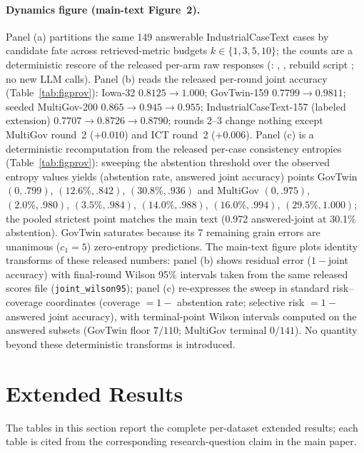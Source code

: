\documentclass[letterpaper]{article}
\begin{document}
\paragraph{Dynamics figure (main-text Figure~2).}
Panel (a) partitions the same 149 answerable IndustrialCaseText cases by candidate fate across retrieved-metric budgets $k\in\{1,3,5,10\}$; the counts are a deterministic rescore of the released per-arm raw responses (: , , rebuild script ; no new LLM calls). Panel (b) reads the released per-round joint accuracy (Table~\ref{tab:figprov}): Iowa-32 $0.8125\to1.000$; GovTwin-159 $0.7799\to0.9811$; seeded MultiGov-200 $0.865\to0.945\to0.955$; IndustrialCaseText-157 (labeled extension) $0.7707\to0.8726\to0.8790$; rounds 2--3 change nothing except MultiGov round~2 ($+0.010$) and ICT round~2 ($+0.006$). Panel (c) is a deterministic recomputation from the released per-case consistency entropies (Table~\ref{tab:figprov}): sweeping the abstention threshold over the observed entropy values yields (abstention rate, answered joint accuracy) points GovTwin $(0,.799)$, $(12.6\%,.842)$, $(30.8\%,.936)$ and MultiGov $(0,.975)$, $(2.0\%,.980)$, $(3.5\%,.984)$, $(14.0\%,.988)$, $(16.0\%,.994)$, $(29.5\%,1.000)$; the pooled strictest point matches the main text (0.972 answered-joint at 30.1\% abstention). GovTwin saturates because its 7 remaining grain errors are unanimous ($c_1{=}5$) zero-entropy predictions. The main-text figure plots identity transforms of these released numbers: panel (b) shows residual error ($1-{}$joint accuracy) with final-round Wilson 95\% intervals taken from the same released scores file (\texttt{joint\_wilson95}); panel (c) re-expresses the sweep in standard risk--coverage coordinates (coverage $=1-$ abstention rate; selective risk $=1-$ answered joint accuracy), with terminal-point Wilson intervals computed on the answered subsets (GovTwin floor $7/110$; MultiGov terminal $0/141$). No quantity beyond these deterministic transforms is introduced.

\section{Extended Results}
The tables in this section report the complete per-dataset extended results; each table is cited from the corresponding research-question claim in the main paper.
\end{document}

